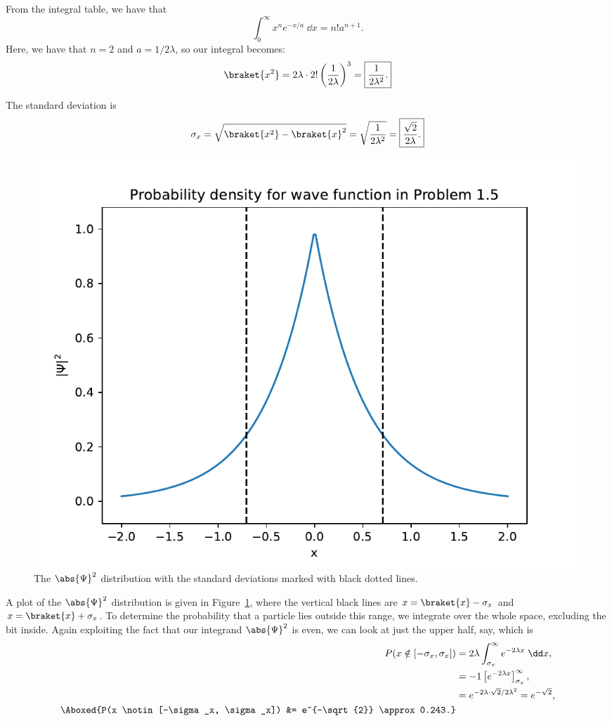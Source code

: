 \begin{parts}
        From the integral table, we have that
        \begin{equation}
            \int_0^{\infty} x^n e^{-x/a} \;\dd x = n! a^{n+1}.
        \end{equation}
        Here, we have that $n=2$ and $a = 1/2\lambda$, so our integral becomes:
        \begin{equation*}
            \braket{x^2} = 2\lambda \cdot 2! \left(\frac{1}{2\lambda}\right)^3 = \boxed{\frac{1}{2\lambda^2}.}
        \end{equation*}
    \item The standard deviation is
        \begin{equation}
            \sigma_x = \sqrt{\braket{x^2} - \braket{x}^2} = \sqrt{\frac{1}{2\lambda^2}} = \boxed{\frac{\sqrt{2}}{2\lambda}.}
        \end{equation}
        \begin{figure}[ht]
            \centering
            \includegraphics[scale=0.7]{./res/plot.pdf}
            \caption{The $\abs{\Psi}^2$ distribution with the standard deviations marked with black dotted lines.}
            \label{PartDPlot}
        \end{figure}
        A plot of the $\abs{\Psi}^2$ distribution is given in Figure~\ref{PartDPlot}, where the vertical black lines are $x = \braket{x} - \sigma_x$ and $x=\braket{x} + \sigma_x$. To determine the probability that a particle lies outside this range, we integrate over the whole space, excluding the bit inside. Again exploiting the fact that our integrand $\abs{\Psi}^2$ is even, we can look at just the upper half, say, which is
        \begin{align*}
            P(x \notin [-\sigma_x, \sigma_x]) &= 2 \lambda \int_{\sigma_x}^{\infty} e^{-2\lambda x} \;\dd x, \\
            &= -1 \left[e^{-2 \lambda x}\right]_{\sigma_x}^{\infty}, \\
            &= e^{-2\lambda \cdot \sqrt{2}/2\lambda^2} = e^{-\sqrt{2}}, \\
            \Aboxed{P(x \notin [-\sigma_x, \sigma_x]) &= e^{-\sqrt{2}} \approx 0.243.}
        \end{align*}
\end{parts}